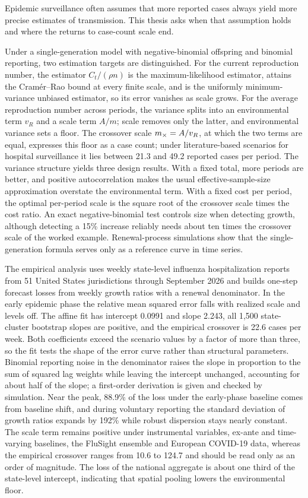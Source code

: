 Epidemic surveillance often assumes that more reported cases always yield more precise estimates of transmission. This thesis asks when that assumption holds and where the returns to case-count scale end.

Under a single-generation model with negative-binomial offspring and binomial reporting, two estimation targets are distinguished. For the current reproduction number, the estimator $C_t/(\rho n)$ is the maximum-likelihood estimator, attains the Cram\'er--Rao bound at every finite scale, and is the uniformly minimum-variance unbiased estimator, so its error vanishes as scale grows. For the average reproduction number across periods, the variance splits into an environmental term $v_R$ and a scale term $A/m$; scale removes only the latter, and environmental variance sets a floor. The crossover scale $m_{\times}=A/v_R$, at which the two terms are equal, expresses this floor as a case count; under literature-based scenarios for hospital surveillance it lies between 21.3 and 49.2 reported cases per period. The variance structure yields three design results. With a fixed total, more periods are better, and positive autocorrelation makes the usual effective-sample-size approximation overstate the environmental term. With a fixed cost per period, the optimal per-period scale is the square root of the crossover scale times the cost ratio. An exact negative-binomial test controls size when detecting growth, although detecting a 15\% increase reliably needs about ten times the crossover scale of the worked example. Renewal-process simulations show that the single-generation formula serves only as a reference curve in time series.

The empirical analysis uses weekly state-level influenza hospitalization reports from 51 United States jurisdictions through September 2026 and builds one-step forecast losses from weekly growth ratios with a renewal denominator. In the early epidemic phase the relative mean squared error falls with realized scale and levels off. The affine fit has intercept 0.0991 and slope 2.243, all 1,500 state-cluster bootstrap slopes are positive, and the empirical crossover is 22.6 cases per week. Both coefficients exceed the scenario values by a factor of more than three, so the fit tests the shape of the error curve rather than structural parameters. Binomial reporting noise in the denominator raises the slope in proportion to the sum of squared lag weights while leaving the intercept unchanged, accounting for about half of the slope; a first-order derivation is given and checked by simulation. Near the peak, 88.9\% of the loss under the early-phase baseline comes from baseline shift, and during voluntary reporting the standard deviation of growth ratios expands by 192\% while robust dispersion stays nearly constant. The scale term remains positive under instrumental variables, ex-ante and time-varying baselines, the FluSight ensemble and European COVID-19 data, whereas the empirical crossover ranges from 10.6 to 124.7 and should be read only as an order of magnitude. The loss of the national aggregate is about one third of the state-level intercept, indicating that spatial pooling lowers the environmental floor.

